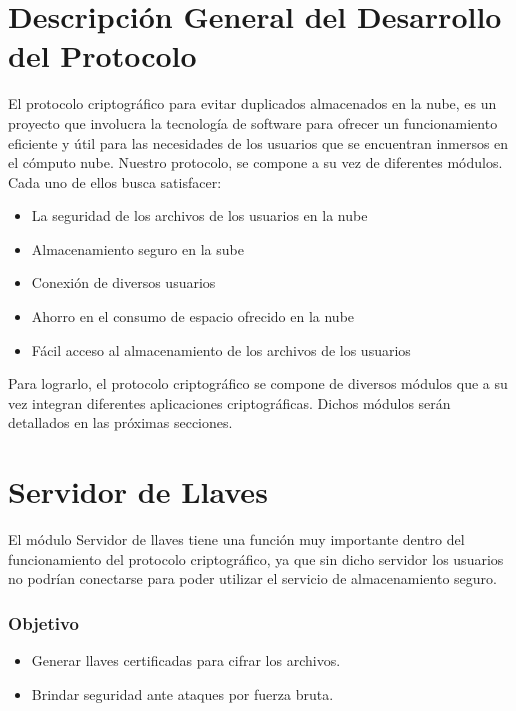


\section{Descripción General del Desarrollo del Protocolo}
El protocolo criptográfico para evitar duplicados almacenados en la nube, es un proyecto que involucra la tecnología de software para ofrecer un funcionamiento eficiente y útil para las necesidades de los usuarios que se encuentran inmersos en el cómputo nube. 
Nuestro protocolo, se compone a su vez de diferentes módulos. Cada uno de ellos busca satisfacer: \\ 

\begin{itemize}

\item La seguridad de los archivos de los usuarios en la nube
\item Almacenamiento seguro en la sube
\item Conexión de diversos usuarios 
\item Ahorro en el consumo de espacio ofrecido en la nube 
\item Fácil acceso al almacenamiento de los archivos de los usuarios 

\end{itemize} 

Para lograrlo, el protocolo criptográfico se compone de diversos módulos que a su vez integran diferentes aplicaciones criptográficas. Dichos módulos serán detallados en las próximas secciones. 

\section{Servidor de Llaves}
El módulo Servidor de llaves tiene una función muy importante dentro del funcionamiento del protocolo criptográfico, ya que sin dicho servidor los usuarios no podrían conectarse para poder utilizar el servicio de almacenamiento seguro. 

\subsubsection{Objetivo}
\begin{itemize}
	\item Generar llaves certificadas para cifrar los archivos.
	\item Brindar seguridad ante ataques por fuerza bruta.
\end{itemize}

